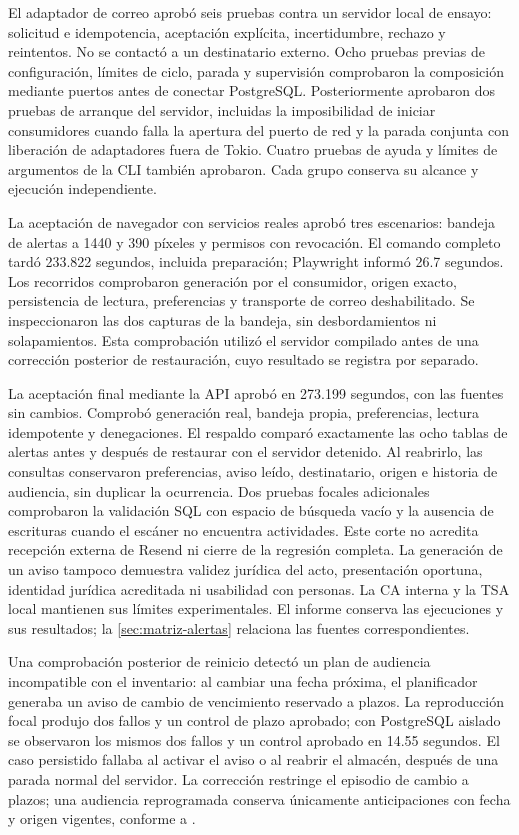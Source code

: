 El adaptador de correo aprobó seis pruebas contra un servidor local de ensayo: solicitud e idempotencia, aceptación explícita, incertidumbre, rechazo y reintentos. No se contactó a un destinatario externo. Ocho pruebas previas de configuración, límites de ciclo, parada y supervisión comprobaron la composición mediante puertos antes de conectar PostgreSQL. Posteriormente aprobaron dos pruebas de arranque del servidor, incluidas la imposibilidad de iniciar consumidores cuando falla la apertura del puerto de red y la parada conjunta con liberación de adaptadores fuera de Tokio. Cuatro pruebas de ayuda y límites de argumentos de la CLI también aprobaron. Cada grupo conserva su alcance y ejecución independiente.

La aceptación de navegador con servicios reales aprobó tres escenarios: bandeja de alertas a 1440 y 390 píxeles y permisos con revocación. El comando completo tardó 233.822 segundos, incluida preparación; Playwright informó 26.7 segundos. Los recorridos comprobaron generación por el consumidor, origen exacto, persistencia de lectura, preferencias y transporte de correo deshabilitado. Se inspeccionaron las dos capturas de la bandeja, sin desbordamientos ni solapamientos. Esta comprobación utilizó el servidor compilado antes de una corrección posterior de restauración, cuyo resultado se registra por separado.

La aceptación final mediante la API aprobó en 273.199 segundos, con las fuentes sin cambios. Comprobó generación real, bandeja propia, preferencias, lectura idempotente y denegaciones. El respaldo comparó exactamente las ocho tablas de alertas antes y después de restaurar con el servidor detenido. Al reabrirlo, las consultas conservaron preferencias, aviso leído, destinatario, origen e historia de audiencia, sin duplicar la ocurrencia. Dos pruebas focales adicionales comprobaron la validación SQL con espacio de búsqueda vacío y la ausencia de escrituras cuando el escáner no encuentra actividades. Este corte no acredita recepción externa de Resend ni cierre de la regresión completa. La generación de un aviso tampoco demuestra validez jurídica del acto, presentación oportuna, identidad jurídica acreditada ni usabilidad con personas. La CA interna y la TSA local mantienen sus límites experimentales. El informe  conserva las ejecuciones y sus resultados; la \cref{sec:matriz-alertas} relaciona las fuentes correspondientes.

Una comprobación posterior de reinicio detectó un plan de audiencia incompatible con el inventario: al cambiar una fecha próxima, el planificador generaba un aviso de cambio de vencimiento reservado a plazos. La reproducción focal produjo dos fallos y un control de plazo aprobado; con PostgreSQL aislado se observaron los mismos dos fallos y un control aprobado en 14.55 segundos. El caso persistido fallaba al activar el aviso o al reabrir el almacén, después de una parada normal del servidor. La corrección restringe el episodio de cambio a plazos; una audiencia reprogramada conserva únicamente anticipaciones con fecha y origen vigentes, conforme a .

